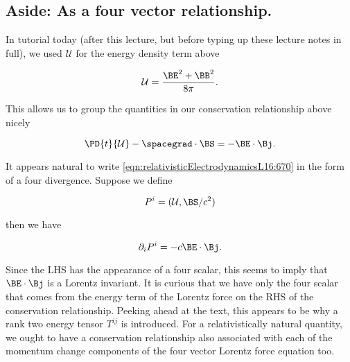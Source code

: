 \subsection{Aside: As a four vector relationship.}

In tutorial today (after this lecture, but before typing up these lecture notes in full), we used $\mathcal{U}$ for the energy density term above

\begin{equation}\label{eqn:relativisticElectrodynamicsL16:650b}
\mathcal{U} = \frac{ \BE^2 + \BB^2 }{8 \pi} .
\end{equation}

This allows us to group the quantities in our conservation relationship above nicely

\begin{equation}\label{eqn:relativisticElectrodynamicsL16:670}
\PD{t}{\mathcal{U}} - \spacegrad \cdot \BS = - \BE \cdot \Bj.
\end{equation}

It appears natural to write \ref{eqn:relativisticElectrodynamicsL16:670} in the form of a four divergence.  Suppose we define

\begin{equation}\label{eqn:relativisticElectrodynamicsL16:710}
P^i = (\mathcal{U}, \BS/c^2)
\end{equation}

then we have

\begin{equation}\label{eqn:relativisticElectrodynamicsL16:730}
\partial_i P^i = - c \BE \cdot \Bj.
\end{equation}

Since the LHS has the appearance of a four scalar, this seems to imply that $\BE \cdot \Bj$ is a Lorentz invariant.  It is curious that we have only the four scalar that comes from the energy term of the Lorentz force on the RHS of the conservation relationship.  Peeking ahead at the text, this appears to be why a rank two energy tensor $T^{ij}$ is introduced.  For a relativistically natural quantity, we ought to have a conservation relationship also associated with each of the momentum change components of the four vector Lorentz force equation too.

\EndArticle

